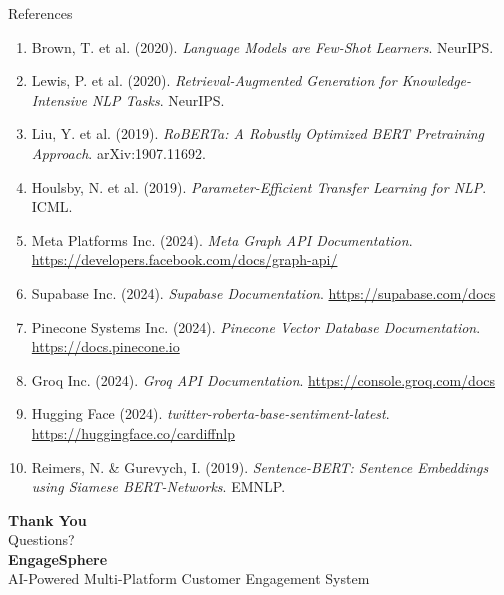 \documentclass[aspectratio=169]{beamer}
\begin{document}
\begin{frame}{References}
  \footnotesize
  \begin{enumerate}
    \item Brown, T. et al. (2020). \textit{Language Models are Few-Shot Learners}. NeurIPS.
    \item Lewis, P. et al. (2020). \textit{Retrieval-Augmented Generation for Knowledge-Intensive NLP Tasks}. NeurIPS.
    \item Liu, Y. et al. (2019). \textit{RoBERTa: A Robustly Optimized BERT Pretraining Approach}. arXiv:1907.11692.
    \item Houlsby, N. et al. (2019). \textit{Parameter-Efficient Transfer Learning for NLP}. ICML.
    \item Meta Platforms Inc. (2024). \textit{Meta Graph API Documentation}. \url{https://developers.facebook.com/docs/graph-api/}
    \item Supabase Inc. (2024). \textit{Supabase Documentation}. \url{https://supabase.com/docs}
    \item Pinecone Systems Inc. (2024). \textit{Pinecone Vector Database Documentation}. \url{https://docs.pinecone.io}
    \item Groq Inc. (2024). \textit{Groq API Documentation}. \url{https://console.groq.com/docs}
    \item Hugging Face (2024). \textit{twitter-roberta-base-sentiment-latest}. \url{https://huggingface.co/cardiffnlp}
    \item Reimers, N. \& Gurevych, I. (2019). \textit{Sentence-BERT: Sentence Embeddings using Siamese BERT-Networks}. EMNLP.
  \end{enumerate}
\end{frame}

\begin{frame}
  \begin{center}
    \vspace{1cm}
    {\Huge \textbf{Thank You}}\\
    \vspace{0.8cm}
    {\large Questions?}\\
    \vspace{1cm}
    \textcolor{esblue}{\textbf{EngageSphere}}\\
    \small AI-Powered Multi-Platform Customer Engagement System
  \end{center}
\end{frame}
\end{document}
